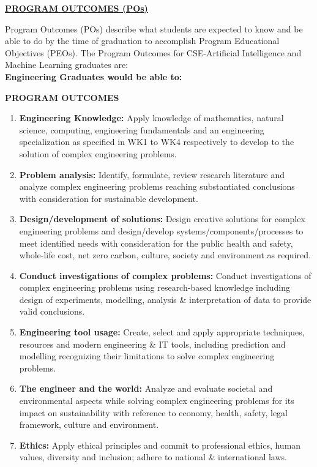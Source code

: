 \newpage
\thispagestyle{fancy}
\begin{center}
    {\fontsize{15}{18}\selectfont \textbf{\underline{PROGRAM OUTCOMES (POs)}}}\\[0.6cm]
\end{center}

\noindent Program Outcomes (POs) describe what students are expected to know and be able to do by the time of graduation to accomplish Program Educational Objectives (PEOs). The Program Outcomes for CSE-Artificial Intelligence and Machine Learning graduates are:\\
\textbf{Engineering Graduates would be able to:}

\vspace{0.3cm}
\noindent \textbf{PROGRAM OUTCOMES}
\begin{enumerate}[leftmargin=2.0em, itemsep=6pt]
    \item \textbf{Engineering Knowledge:} Apply knowledge of mathematics, natural science, computing, engineering fundamentals and an engineering specialization as specified in WK1 to WK4 respectively to develop to the solution of complex engineering problems.
    \item \textbf{Problem analysis:} Identify, formulate, review research literature and analyze complex engineering problems reaching substantiated conclusions with consideration for sustainable development.
    \item \textbf{Design/development of solutions:} Design creative solutions for complex engineering problems and design/develop systems/components/processes to meet identified needs with consideration for the public health and safety, whole-life cost, net zero carbon, culture, society and environment as required.
    \item \textbf{Conduct investigations of complex problems:} Conduct investigations of complex engineering problems using research-based knowledge including design of experiments, modelling, analysis \& interpretation of data to provide valid conclusions.
    \item \textbf{Engineering tool usage:} Create, select and apply appropriate techniques, resources and modern engineering \& IT tools, including prediction and modelling recognizing their limitations to solve complex engineering problems.
    \item \textbf{The engineer and the world:} Analyze and evaluate societal and environmental aspects while solving complex engineering problems for its impact on sustainability with reference to economy, health, safety, legal framework, culture and environment.
    \item \textbf{Ethics:} Apply ethical principles and commit to professional ethics, human values, diversity and inclusion; adhere to national \& international laws.
\end{enumerate}

